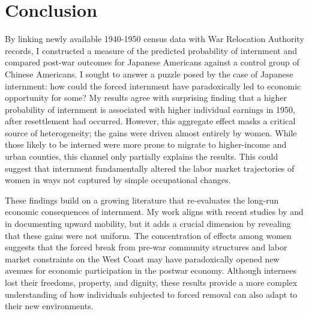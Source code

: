 \section{Conclusion}

By linking newly available 1940-1950 census data 
with War Relocation Authority records,
I constructed a measure of the predicted probability of internment 
and compared post-war outcomes for Japanese Americans 
against a control group of Chinese Americans.
I sought to answer a puzzle posed by the case of Japanese internment:
how could the forced internment have paradoxically 
led to economic opportunity for some?
My results agree with surprising finding that a higher probability of internment
is associated with higher individual earnings in 1950, after resettlement had occurred.
However, this aggregate effect masks a critical source of heterogeneity;
the gains were driven almost entirely by women.
While those likely to be interned were more prone to migrate to higher-income and urban counties,
this channel only partially explains the results.
This could suggest that internment fundamentally altered the labor market trajectories of women
in ways not captured by simple occupational changes.

These findings build on a growing literature
that re-evaluates the long-run economic consequences of internment.
My work aligns with recent studies 
by \cite{arellano-boverDisplacementDiversityMobility2022} 
and \cite{shoagCausalEffectPlace2016} 
in documenting upward mobility,
but it adds a crucial dimension by revealing that these gains were not uniform.
The concentration of effects among women
suggests that the forced break from pre-war community structures
and labor market constraints on the West Coast
may have paradoxically opened new avenues for economic participation in the postwar economy.
Although internees lost their freedoms, property, and dignity,
these results provide a more complex understanding
of how individuals subjected to forced removal
can also adapt to their new environments.
